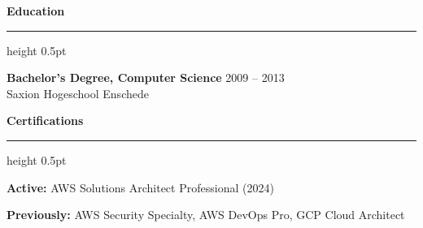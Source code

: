 \vspace{0.1cm}
\begin{minipage}[t]{0.48\textwidth}
{\large\bfseries\color{primary}Education}
\vspace{0.1cm}
\hrule height 0.5pt
\vspace{0.15cm}

\textbf{Bachelor's Degree, Computer Science} \hfill {\small\color{darkgray}2009 -- 2013}\\
{\color{accent}Saxion Hogeschool Enschede}
\end{minipage}
\hfill
\begin{minipage}[t]{0.48\textwidth}
{\large\bfseries\color{primary}Certifications}
\vspace{0.1cm}
\hrule height 0.5pt
\vspace{0.15cm}

\textbf{Active:} AWS Solutions Architect Professional (2024)

\vspace{0.05cm}
{\small\textbf{Previously:} AWS Security Specialty, AWS DevOps Pro, GCP Cloud Architect}
\end{minipage}
